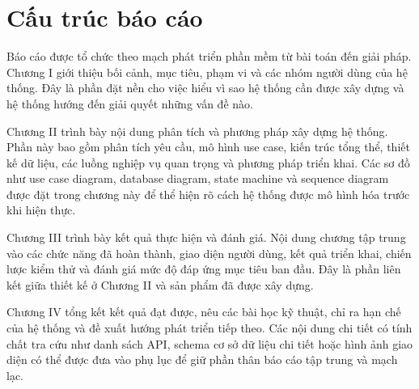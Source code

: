 \section{Cấu trúc báo cáo}
Báo cáo được tổ chức theo mạch phát triển phần mềm từ bài toán đến giải pháp. Chương I giới thiệu bối cảnh, mục tiêu, phạm vi và các nhóm người dùng của hệ thống. Đây là phần đặt nền cho việc hiểu vì sao hệ thống cần được xây dựng và hệ thống hướng đến giải quyết những vấn đề nào.

Chương II trình bày nội dung phân tích và phương pháp xây dựng hệ thống. Phần này bao gồm phân tích yêu cầu, mô hình use case, kiến trúc tổng thể, thiết kế dữ liệu, các luồng nghiệp vụ quan trọng và phương pháp triển khai. Các sơ đồ như use case diagram, database diagram, state machine và sequence diagram được đặt trong chương này để thể hiện rõ cách hệ thống được mô hình hóa trước khi hiện thực.

Chương III trình bày kết quả thực hiện và đánh giá. Nội dung chương tập trung vào các chức năng đã hoàn thành, giao diện người dùng, kết quả triển khai, chiến lược kiểm thử và đánh giá mức độ đáp ứng mục tiêu ban đầu. Đây là phần liên kết giữa thiết kế ở Chương II và sản phẩm đã được xây dựng.

Chương IV tổng kết kết quả đạt được, nêu các bài học kỹ thuật, chỉ ra hạn chế của hệ thống và đề xuất hướng phát triển tiếp theo. Các nội dung chi tiết có tính chất tra cứu như danh sách API, schema cơ sở dữ liệu chi tiết hoặc hình ảnh giao diện có thể được đưa vào phụ lục để giữ phần thân báo cáo tập trung và mạch lạc.
